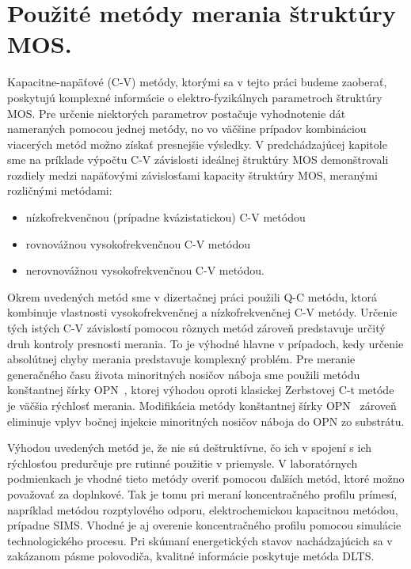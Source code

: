 
\chapter{Použité metódy merania štruktúry MOS.}\label{Chapter3}

Kapacitne-napäťové (C-V) metódy, ktorými sa v tejto práci budeme
zaoberať, poskytujú komplexné informácie o elektro-fyzikálnych
parametroch štruktúry MOS\@. Pre určenie niektorých parametrov
postačuje vyhodnotenie dát nameraných pomocou jednej metódy, no vo
väčšine prípadov kombináciou viacerých metód možno získať presnejšie
výsledky.  V predchádzajúcej kapitole sme na príklade výpočtu C-V
závislosti ideálnej štruktúry MOS demonštrovali rozdiely medzi
napäťovými závislosťami kapacity štruktúry MOS, meranými rozličnými
metódami:

\begin{itemize}
\item nízkofrekvenčnou (prípadne kvázistatickou) C-V metódou
\item rovnovážnou vysokofrekvenčnou C-V metódou
\item nerovnovážnou vysokofrekvenčnou C-V metódou.
\end{itemize}

Okrem uvedených metód sme v dizertačnej práci použili Q-C metódu,
ktorá kombinuje vlastnosti vysokofrekvenčnej a nízkofrekvenčnej C-V
metódy. Určenie tých istých C-V závislostí pomocou rôznych metód
zároveň predstavuje určitý druh kontroly presnosti merania.  To je
výhodné hlavne v prípadoch, kedy určenie absolútnej chyby merania
predstavuje komplexný problém. Pre meranie generačného času života
minoritných nosičov náboja sme použili metódu konštantnej šírky
OPN~\cite{3.1}, ktorej výhodou oproti klasickej Zerbstovej C-t
metóde~\cite{3.2} je väčšia rýchlosť merania. Modifikácia metódy
konštantnej šírky OPN~\cite{3.3} zároveň eliminuje vplyv bočnej
injekcie minoritných nosičov náboja do OPN zo substrátu.

Výhodou uvedených metód je, že nie sú deštruktívne, čo ich v spojení s
ich rýchlosťou predurčuje pre rutinné použitie v priemysle.  V
laboratórnych podmienkach je vhodné tieto metódy overiť pomocou
ďalších metód, ktoré možno považovať za doplnkové. Tak je tomu pri
meraní koncentračného profilu prímesí, napríklad metódou rozptylového
odporu, elektrochemickou kapacitnou metódou, prípadne SIMS\@. Vhodné
je aj overenie koncentračného profilu pomocou simulácie
technologického procesu. Pri skúmaní energetických stavov
nachádzajúcich sa v zakázanom pásme polovodiča, kvalitné informácie
poskytuje metóda DLTS\@.

